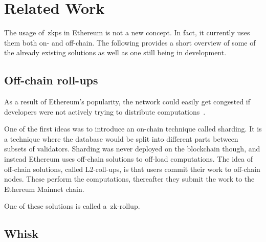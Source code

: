 
\section{Related Work}\label{sec:related-work}
The usage of~\glspl{zkp} in Ethereum is not a new concept.
In fact, it currently uses them both on- and off-chain.
The following provides a short overview of some of the already existing solutions as well as one still being in development.

\subsection{Off-chain roll-ups}\label{subsec:off-chain-roll-ups}
As a result of Ethereum's popularity, the network could easily get congested if developers were not actively trying to distribute computations~\cite{EthereumScaling2024}.

One of the first ideas was to introduce an on-chain technique called sharding.
It is a technique where the database would be split into different parts between subsets of validators.
Sharding was never deployed on the blockchain though, and instead Ethereum uses off-chain solutions to off-load computations.
The idea of off-chain solutions, called L2-roll-ups, is that users commit their work to off-chain nodes.
These perform the computations, thereafter they submit the work to the Ethereum Mainnet chain.

One of these solutions is called a~\gls{zk-rollup}.
\subsection{Whisk}\label{subsec:whisk}

